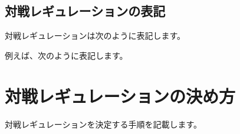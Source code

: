 \documentclass[letterpaper,10pt,dvipdfmx]{sphinxmanual}
\begin{document}
\subsection{対戦レギュレーションの表記}
\label{\detokenize{match-regulations/match-regulations:id4}}
\sphinxAtStartPar
対戦レギュレーションは次のように表記します。

\begin{sphinxVerbatim}[commandchars=\\\{\}]
\end{sphinxVerbatim}

\sphinxAtStartPar
例えば、次のように表記します。

\begin{sphinxVerbatim}[commandchars=\\\{\}]
\end{sphinxVerbatim}


\section{対戦レギュレーションの決め方}
\label{\detokenize{match-regulations/match-regulations:id5}}
\sphinxAtStartPar
対戦レギュレーションを決定する手順を記載します。
\end{document}
